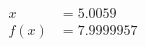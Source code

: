 \documentclass[preview]{standalone}
\begin{document}
\begin{align*}
x &= 5.0059\\f(x) &= 7.9999957
\end{align*}
\end{document}
